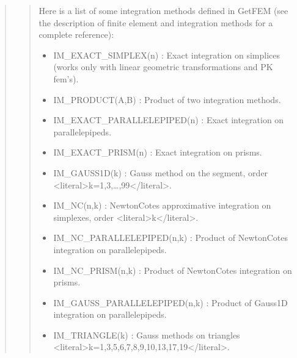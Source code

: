 \documentclass[a4paper,11pt,english]{sphinxmanual}
\begin{document}
\sphinxAtStartPar
{}
\begin{quote}

\sphinxAtStartPar
{}
\begin{quote}

\sphinxAtStartPar
Here is a list of some integration methods defined in GetFEM (see the
description of finite element and integration methods for a complete
reference):
\begin{itemize}
\item {} 
\sphinxAtStartPar
IM\_EXACT\_SIMPLEX(n) :
Exact integration on simplices (works only with linear geometric
transformations and PK fem’s).

\item {} 
\sphinxAtStartPar
IM\_PRODUCT(A,B) :
Product of two integration methods.

\item {} 
\sphinxAtStartPar
IM\_EXACT\_PARALLELEPIPED(n) :
Exact integration on parallelepipeds.

\item {} 
\sphinxAtStartPar
IM\_EXACT\_PRISM(n) :
Exact integration on prisms.

\item {} 
\sphinxAtStartPar
IM\_GAUSS1D(k) :
Gauss method on the segment, order \textless{}literal\textgreater{}k=1,3,…,99\textless{}/literal\textgreater{}.

\item {} 
\sphinxAtStartPar
IM\_NC(n,k) :
Newton\sphinxhyphen{}Cotes approximative integration on simplexes, order \textless{}literal\textgreater{}k\textless{}/literal\textgreater{}.

\item {} 
\sphinxAtStartPar
IM\_NC\_PARALLELEPIPED(n,k) :
Product of Newton\sphinxhyphen{}Cotes integration on parallelepipeds.

\item {} 
\sphinxAtStartPar
IM\_NC\_PRISM(n,k) :
Product of Newton\sphinxhyphen{}Cotes integration on prisms.

\item {} 
\sphinxAtStartPar
IM\_GAUSS\_PARALLELEPIPED(n,k) :
Product of Gauss1D integration on parallelepipeds.

\item {} 
\sphinxAtStartPar
IM\_TRIANGLE(k) :
Gauss methods on triangles \textless{}literal\textgreater{}k=1,3,5,6,7,8,9,10,13,17,19\textless{}/literal\textgreater{}.


\end{itemize}
\end{quote}
\end{quote}
\end{document}
